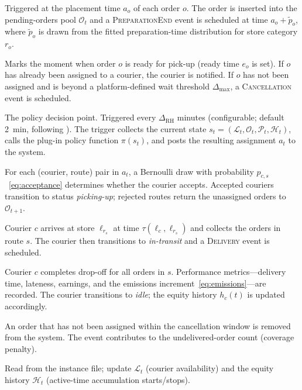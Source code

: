 \documentclass[12pt,a4paper]{report}
\begin{document}
\begin{description}[leftmargin=3.5cm,style=nextline]
    \item[\textsc{OrderArrival}]
        Triggered at the placement time $a_o$ of each order $o$. The order is inserted into the pending-orders pool $\mathcal{O}_t$ and a \textsc{PreparationEnd} event is
        scheduled at time $a_o + \tilde{p}_o$, where $\tilde{p}_o$ is drawn from the fitted preparation-time distribution for store category $r_o$.

    \item[\textsc{PreparationEnd}]
        Marks the moment when order $o$ is ready for pick-up (ready time $e_o$ is set). If $o$ has already been assigned to a courier, the courier is notified. If $o$ has not been assigned and is beyond a platform-defined wait threshold $\Delta_{\max}$, a \textsc{Cancellation} event is scheduled.

    \item[\textsc{RollingHorizonTrigger}]
        The policy decision point. Triggered every $\Delta_{\text{RH}}$ minutes (configurable; default 2~min, following \citealt{reyes2018meal}). The trigger collects the current state $s_t = (\mathcal{L}_t, \mathcal{O}_t, \mathcal{P}_t, \mathcal{H}_t)$, calls the plug-in policy function $\pi(s_t)$, and posts the resulting assignment $a_t$ to the
        system.

    \item[\textsc{AcceptanceRealisation}]
        For each (courier, route) pair in $a_t$, a Bernoulli draw with probability
        $p_{c,s}$~\eqref{eq:acceptance} determines whether the courier accepts. Accepted couriers transition to status \textit{picking-up}; rejected routes return the unassigned orders to $\mathcal{O}_{t+1}$.

    \item[\textsc{PickUp}]
        Courier $c$ arrives at store $\ell_{r_s}$ at time $\tau(\ell_c, \ell_{r_s})$ and collects the orders in route $s$. The courier then transitions to \textit{in-transit} and a \textsc{Delivery} event is scheduled.

    \item[\textsc{Delivery}]
        Courier $c$ completes drop-off for all orders in $s$. Performance metrics---delivery time, lateness, earnings, and the emissions increment~\eqref{eq:emissions}---are recorded. The courier transitions to \textit{idle}; the equity history $h_c(t)$ is updated accordingly.

    \item[\textsc{Cancellation}]
        An order that has not been assigned within the cancellation window is removed from the system. The event contributes to the undelivered-order count (coverage penalty).

    \item[\textsc{CourierLogin} / \textsc{CourierLogout}]
        Read from the instance file; update $\mathcal{L}_t$ (courier availability) and the equity history $\mathcal{H}_t$ (active-time accumulation starts/stops).
\end{description}
\end{document}
